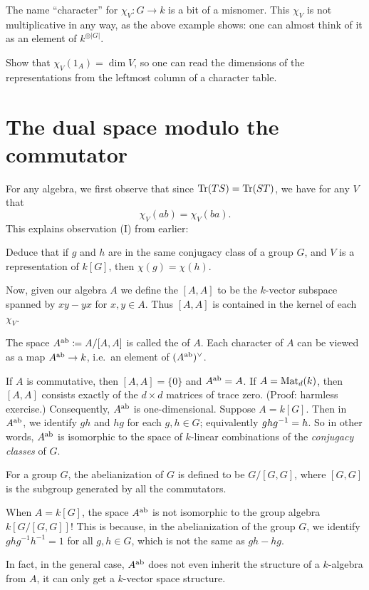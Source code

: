 \begin{abuse}
	The name ``character'' for $\chi_V \colon G \to k$ is a bit of a misnomer.
	This $\chi_V$ is not multiplicative in any way,
	as the above example shows: one can almost think of it as
	an element of $k^{\oplus |G|}$.
\end{abuse}

\begin{ques}
	Show that $\chi_V(1_A) = \dim V$,
	so one can read the dimensions of the representations
	from the leftmost column of a character table.
\end{ques}

\section{The dual space modulo the commutator}
For any algebra, we first observe that since $\operatorname{Tr}(TS) = \operatorname{Tr}(ST)$,
we have for any $V$ that
\[ \chi_V(ab) = \chi_V(ba). \]
This explains observation (I) from earlier:
\begin{ques}
	Deduce that if $g$ and $h$ are in the same conjugacy class of a
	group $G$, and $V$ is a representation of $k[G]$,
	then $\chi(g) = \chi(h)$.
\end{ques}
Now, given our algebra $A$ we define the  $[A,A]$
to be the $k$-vector subspace spanned by $xy-yx$ for $x,y \in A$.
Thus $[A,A]$ is contained in the kernel of each $\chi_V$.
\begin{definition}
	The space $A^\text{ab} \coloneqq A / [A,A]$ is called the  of $A$.
	Each character of $A$ can be viewed as a map $A^\text{ab} \to k$, i.e.\ an element of $(A^\text{ab})^\vee$.
\end{definition}
\begin{example}
	\listhack
	\begin{enumerate}[(a)]
		\ii If $A$ is commutative, then $[A,A] = \{0\}$
		and $A^\text{ab} = A$.
		\ii If $A = \mathrm{Mat}_d(k)$, then $[A,A]$ consists exactly
		of the $d \times d$ matrices of trace zero.
		(Proof: harmless exercise.)
		Consequently, $A^\text{ab}$ is one-dimensional.
		\ii Suppose $A = k[G]$.
		Then in $A^\text{ab}$, we identify $gh$ and $hg$ for each $g,h \in G$;
		equivalently $ghg^{-1} = h$.
		So in other words, $A^\text{ab}$ is isomorphic to the space of
		$k$-linear combinations of the \emph{conjugacy classes} of $G$.
	\end{enumerate}
\end{example}
\begin{remark}
	[Warning] For a group $G$, the abelianization of $G$ is defined to be
	$G/[G, G]$, where $[G, G]$ is the subgroup generated by all the commutators.

	When $A=k[G]$, the space $A^\text{ab}$ is not isomorphic to the group algebra
	$k[G/[G, G]]$! This is because, in the abelianization of the group $G$,
	we identify $ghg^{-1} h^{-1}=1$ for all $g, h \in G$, which is not the same
	as $gh-hg$.

	In fact, in the general case, $A^\text{ab}$ does not even inherit the structure of a
	$k$-algebra from $A$, it can only get a $k$-vector space structure.
\end{remark}


